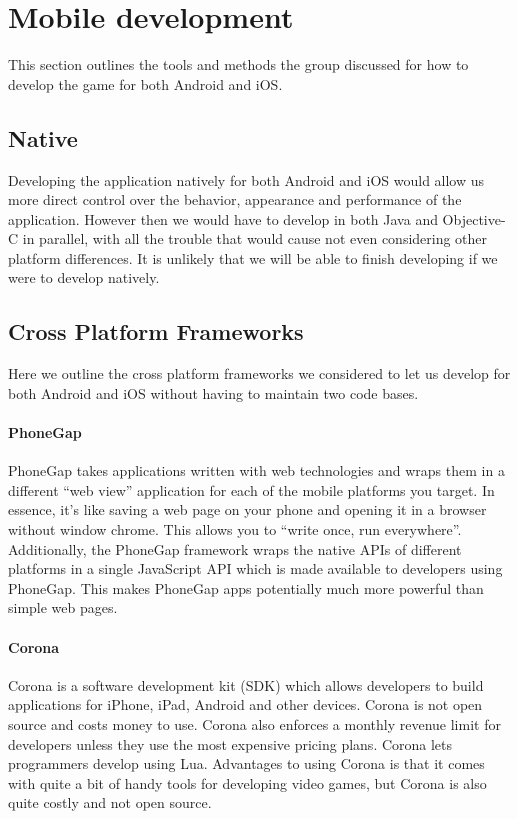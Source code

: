 \section{Mobile development}

This section outlines the tools and methods the group discussed for how to
develop the game for both Android and iOS.

\subsection{Native}

Developing the application natively for both Android and iOS would allow us more
direct control over the behavior, appearance and performance of the application.
However then we would have to develop in both Java and Objective-C in parallel,
with all the trouble that would cause not even considering other platform
differences. It is unlikely that we will be able to finish developing if we were
to develop natively.

\subsection{Cross Platform Frameworks}

Here we outline the cross platform frameworks we considered to let us develop for
both Android and iOS without having to maintain two code bases.

\paragraph{PhoneGap}
PhoneGap takes applications written with web technologies and wraps them in
a different ``web view'' application for each of the mobile platforms you
target. In essence, it's like saving a web page on your phone and opening
it in a browser without window chrome. This allows you to ``write once, run
everywhere''. Additionally, the PhoneGap framework wraps the native APIs of
different platforms in a single JavaScript API which is made available to
developers using PhoneGap. This makes PhoneGap apps potentially much more
powerful than simple web pages. \cite{phonegapAbout}

\paragraph{Corona}

Corona is a software development kit (SDK) which allows developers to build
applications for iPhone, iPad, Android and other devices. Corona is not open
source and costs money to use. Corona also enforces a monthly revenue limit for
developers unless they use the most expensive pricing plans\cite{coronaPrice}.
Corona lets programmers develop using Lua.\cite{coronaSDK} Advantages to using
Corona is that it comes with quite a bit of handy tools for developing video
games, but Corona is also quite costly and not open source.

